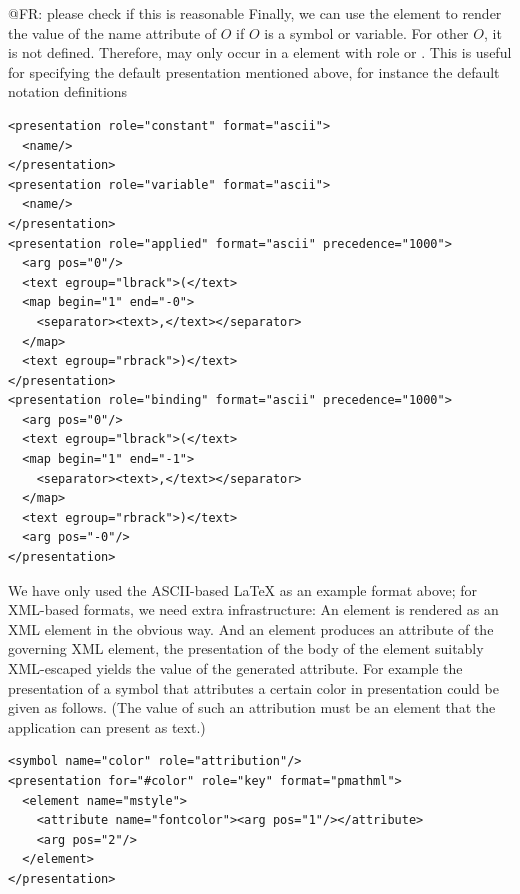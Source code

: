 \documentclass[a4paper]{article}
\begin{document}
\begin{newpart}{@FR: please check if this is reasonable}
  Finally, we can use the {} element to render the value of the name
  attribute of $O$ if $O$ is a symbol or variable. For other $O$, it is not defined.
  Therefore, {} may only occur in a {} element with
  role {} or {}.
  This is useful for specifying the default presentation mentioned above, for instance the
  default notation definitions
\begin{lstlisting}[mathescape]
<presentation role="constant" format="ascii">
  <name/>
</presentation>
<presentation role="variable" format="ascii">
  <name/>
</presentation>
<presentation role="applied" format="ascii" precedence="1000">
  <arg pos="0"/>
  <text egroup="lbrack">(</text>
  <map begin="1" end="-0">
    <separator><text>,</text></separator>
  </map>
  <text egroup="rbrack">)</text>
</presentation>
<presentation role="binding" format="ascii" precedence="1000">
  <arg pos="0"/>
  <text egroup="lbrack">(</text>
  <map begin="1" end="-1">
    <separator><text>,</text></separator>
  </map>
  <text egroup="rbrack">)</text>
  <arg pos="-0"/>
</presentation>
\end{lstlisting}
\end{newpart}

We have only used the ASCII-based {\LaTeX} as an example format above; for XML-based
formats, we need extra infrastructure: An {} element is rendered as an
XML element in the obvious way. And an {} element produces an attribute
of the governing XML element, the presentation of the body of the element suitably
XML-escaped yields the value of the generated attribute. For example the presentation of a
symbol that attributes a certain color in presentation {\mathml} could be given as
follows. (The value of such an attribution must be an {} element that
the application can present as text.)
\begin{lstlisting}[mathescape]
<symbol name="color" role="attribution"/>
<presentation for="#color" role="key" format="pmathml">
  <element name="mstyle">
    <attribute name="fontcolor"><arg pos="1"/></attribute>
    <arg pos="2"/>
  </element>
</presentation>
\end{lstlisting}
\end{document}
